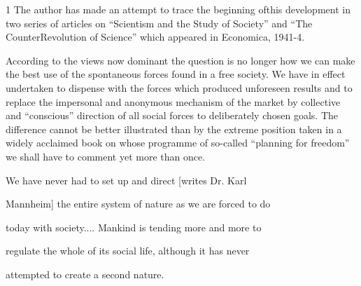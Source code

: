 \documentclass[11pt,openany]{book}
\begin{document}
1 The author has made an attempt to trace the beginning ofthis development in two series of articles on ``Scientism and the Study of Society'' and ``The CounterRevolution of Science'' which appeared in Economica, 1941-4.

According to the views now dominant the question is no longer how we can make the best use of the spontaneous forces found in a free society. We have in effect undertaken to dispense with the forces which produced unforeseen results and to replace the impersonal and anonymous mechanism of the market by collective and ``conscious'' direction of all social forces to deliberately chosen goals. The difference cannot be better illustrated than by the extreme position taken in a widely acclaimed book on whose programme of so-called ``planning for freedom'' we shall have to comment yet more than once.

We have never had to set up and direct [writes Dr. Karl

Mannheim] the entire system of nature as we are forced to do

today with society.... Mankind is tending more and more to

regulate the whole of its social life, although it has never

attempted to create a second nature.

\begin{center}\textasteriskcentered\hspace{0.9em}\textasteriskcentered\hspace{0.9em}\textasteriskcentered\end{center}

\begin{center}\textasteriskcentered\hspace{0.9em}\textasteriskcentered\hspace{0.9em}\textasteriskcentered\end{center}

\begin{center}\textasteriskcentered\hspace{0.9em}\textasteriskcentered\hspace{0.9em}\textasteriskcentered\end{center}

\begin{center}\textasteriskcentered\hspace{0.9em}\textasteriskcentered\hspace{0.9em}\textasteriskcentered\end{center}
\end{document}
